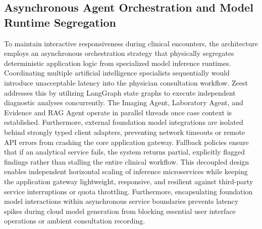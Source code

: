 \subsection{Asynchronous Agent Orchestration and Model Runtime Segregation}
To maintain interactive responsiveness during clinical encounters, the architecture employs an asynchronous orchestration strategy that physically segregates deterministic application logic from specialized model inference runtimes. Coordinating multiple artificial intelligence specialists sequentially would introduce unacceptable latency into the physician consultation workflow. Zeest addresses this by utilizing LangGraph state graphs to execute independent diagnostic analyses concurrently. The Imaging Agent, Laboratory Agent, and Evidence and RAG Agent operate in parallel threads once case context is established. Furthermore, external foundation model integrations are isolated behind strongly typed client adapters, preventing network timeouts or remote API errors from crashing the core application gateway. Fallback policies ensure that if an analytical service fails, the system returns partial, explicitly flagged findings rather than stalling the entire clinical workflow. This decoupled design enables independent horizontal scaling of inference microservices while keeping the application gateway lightweight, responsive, and resilient against third-party service interruptions or quota throttling. Furthermore, encapsulating foundation model interactions within asynchronous service boundaries prevents latency spikes during cloud model generation from blocking essential user interface operations or ambient consultation recording.

